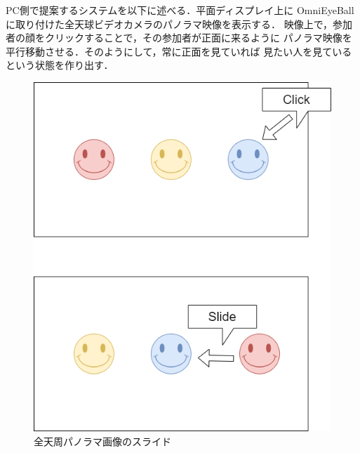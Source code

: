 



PC側で提案するシステムを以下に述べる．平面ディスプレイ上に
OmniEyeBallに取り付けた全天球ビデオカメラのパノラマ映像を表示する．
映像上で，参加者の顔をクリックすることで，その参加者が正面に来るように
パノラマ映像を平行移動させる．そのようにして，常に正面を見ていれば
見たい人を見ているという状態を作り出す．

\begin{figure}[tbp]
  \centering
  \includegraphics[scale=0.6]{fig/PCsideSlide.png}
  \caption{全天周パノラマ画像のスライド}
\end{figure}

